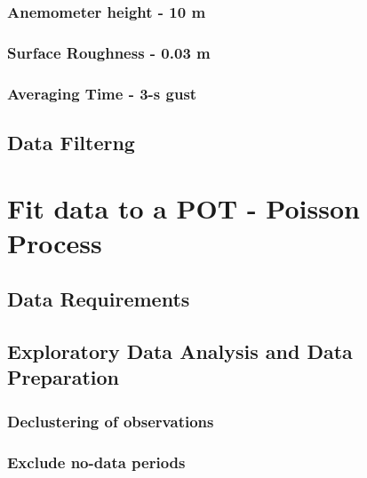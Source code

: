 \documentclass[12pt,twoside]{reedthesis}
\begin{document}
\hypertarget{anemometer-height---10-m}{%
\subsubsection{Anemometer height - 10 m}\label{anemometer-height---10-m}}

\hypertarget{surface-roughness---0.03-m}{%
\subsubsection{Surface Roughness - 0.03 m}\label{surface-roughness---0.03-m}}

\hypertarget{averaging-time---3-s-gust}{%
\subsubsection{Averaging Time - 3-s gust}\label{averaging-time---3-s-gust}}

\hypertarget{data-filterng}{%
\subsection{Data Filterng}\label{data-filterng}}

\hypertarget{fit-data-to-a-pot---poisson-process}{%
\section{Fit data to a POT - Poisson Process}\label{fit-data-to-a-pot---poisson-process}}

\hypertarget{data-requirements}{%
\subsection{Data Requirements}\label{data-requirements}}

\hypertarget{exploratory-data-analysis-and-data-preparation}{%
\subsection{Exploratory Data Analysis and Data Preparation}\label{exploratory-data-analysis-and-data-preparation}}

\hypertarget{declustering-of-observations}{%
\subsubsection{Declustering of observations}\label{declustering-of-observations}}

\hypertarget{exclude-no-data-periods}{%
\subsubsection{Exclude no-data periods}\label{exclude-no-data-periods}}
\end{document}
